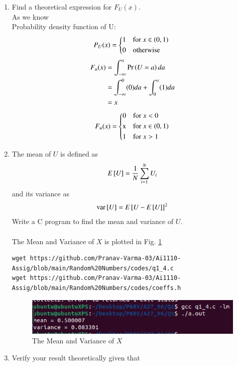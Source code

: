 \documentclass[journal,12pt,twocolumn]{IEEEtran}
\renewcommand\thesection{\arabic{section}}
\begin{document}
\begin{enumerate}[label=\thesection.\arabic*
,ref=\thesection.\theenumi]
%
\item
Find a  theoretical expression for $F_{U}(x)$.\\
\solution As we know \\
Probability density function of U:
\begin{equation}
     P_U(x) = 
    \begin{cases*}
        1 & for $x\in(0,1)$ \\
        0 & otherwise \\
    \end{cases*}
\end{equation}
\begin{align*}
    F_u(x) &= \int_{- \infty }^{x} \Pr\left(U=a\right) da\\
     &= \int_{- \infty }^{0} (0) da + \int_{0}^{x} (1) da\\
     &= x
\end{align*}
\begin{equation}
    F_u(x) = 
    \begin{cases*}
    0 & for $x<0$\\
    $x$ & for $x \in (0,1)$\\
    1 & for $x>1$
    \end{cases*}
\end{equation}
\item
The mean of $U$ is defined as
\begin{equation}
E{}\left[U\right] = \frac{1}{N}\sum_{i=1}^{N}U_i
\end{equation}
%
and its variance as
%
\begin{equation}
\text{var}{}\left[U\right] = E{}\left[U- E{}\left[U\right]\right]^2 
\end{equation}
Write a C program to  find the mean and variance of $U$. \\
\solution\\
The Mean and Variance of $X$ is plotted in Fig. \ref{fig:mean_variance}
\begin{lstlisting}
wget https://github.com/Pranav-Varma-03/Ai1110-Assig/blob/main/Random%20Numbers/codes/q1_4.c
wget https://github.com/Pranav-Varma-03/Ai1110-Assig/blob/main/Random%20Numbers/codes/coeffs.h
\end{lstlisting}
\begin{figure}[ht]
\centering
\includegraphics[width=\columnwidth]{./figs/q1.png}
\caption{The Mean and Variance of $X$}
\label{fig:mean_variance}
\end{figure}
\item Verify your result theoretically given that
\end{enumerate}
\end{document}
